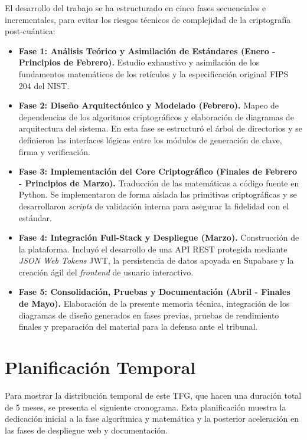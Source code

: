 \documentclass[11pt, a4paper]{report}
\theoremstyle{definition}
\begin{document}
El desarrollo del trabajo se ha estructurado en cinco fases secuenciales e incrementales, para evitar los riesgos técnicos de complejidad de la criptografía post-cuántica:

\begin{itemize}
    \item \textbf{Fase 1: Análisis Teórico y Asimilación de Estándares (Enero - Principios de Febrero).} Estudio exhaustivo y asimilación de los fundamentos matemáticos de los retículos y la especificación original FIPS 204 del NIST.
    
    \item \textbf{Fase 2: Diseño Arquitectónico y Modelado (Febrero).} Mapeo de dependencias de los algoritmos criptográficos y elaboración de diagramas de arquitectura del sistema. En esta fase se estructuró el árbol de directorios y se definieron las interfaces lógicas entre los módulos de generación de clave, firma y verificación.
    
    \item \textbf{Fase 3: Implementación del Core Criptográfico (Finales de Febrero - Principios de Marzo).} Traducción de las matemáticas a código fuente en Python. Se implementaron de forma aislada las primitivas criptográficas y se desarrollaron \textit{scripts} de validación interna para asegurar la fidelidad con el estándar.
    
    \item \textbf{Fase 4: Integración Full-Stack y Despliegue (Marzo).} Construcción de la plataforma. Incluyó el desarrollo de una API REST protegida mediante \textit{JSON Web Tokens} JWT, la persistencia de datos apoyada en Supabase y la creación ágil del \textit{frontend} de usuario interactivo.
    
    \item \textbf{Fase 5: Consolidación, Pruebas y Documentación (Abril - Finales de Mayo).} Elaboración de la presente memoria técnica, integración de los diagramas de diseño generados en fases previas, pruebas de rendimiento finales y preparación del material para la defensa ante el tribunal.
\end{itemize}

\section{Planificación Temporal}

Para mostrar la distribución temporal de este TFG, que hacen una duración total de 5 meses, se presenta el siguiente cronograma. Esta planificación muestra la dedicación inicial a la fase algorítmica y matemática y la posterior aceleración en las fases de despliegue web y documentación.
\end{document}
